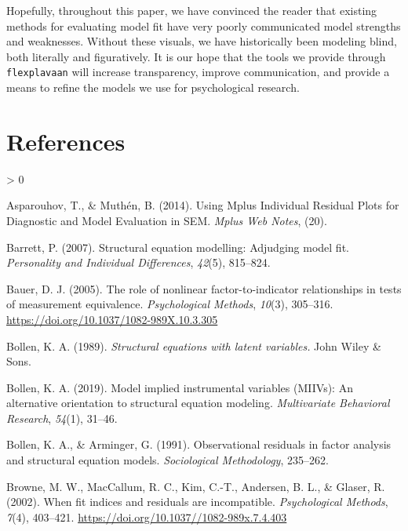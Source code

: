 \documentclass[
  english,
  man]{apa6}
\newlength{\cslhangindent}
\newenvironment{CSLReferences}[2] %
 {%
  \setlength{\parindent}{0pt}
  \ifodd #1 \everypar{\setlength{\hangindent}{\cslhangindent}}\ignorespaces\fi
  \ifnum #2 > 0
  \setlength{\parskip}{#2\baselineskip}
  \fi
 }%
 {}
\begin{document}
Hopefully, throughout this paper, we have convinced the reader that existing methods for evaluating model fit have very poorly communicated model strengths and weaknesses. Without these visuals, we have historically been modeling blind, both literally and figuratively. It is our hope that the tools we provide through \texttt{flexplavaan} will increase transparency, improve communication, and provide a means to refine the models we use for psychological research.

\hypertarget{references}{%
\section{References}\label{references}}

\hypertarget{refs}{}
\begin{CSLReferences}{1}{0}
\leavevmode\hypertarget{ref-asparouhov2014using}{}%
Asparouhov, T., \& Muthén, B. (2014). {Using Mplus Individual Residual Plots for Diagnostic and Model Evaluation in SEM}. \emph{Mplus Web Notes}, (20).

\leavevmode\hypertarget{ref-barrett2007structural}{}%
Barrett, P. (2007). Structural equation modelling: Adjudging model fit. \emph{Personality and Individual Differences}, \emph{42}(5), 815--824.

\leavevmode\hypertarget{ref-Bauer2005}{}%
Bauer, D. J. (2005). {The role of nonlinear factor-to-indicator relationships in tests of measurement equivalence}. \emph{Psychological Methods}, \emph{10}(3), 305--316. \url{https://doi.org/10.1037/1082-989X.10.3.305}

\leavevmode\hypertarget{ref-bollen_structural_1989}{}%
Bollen, K. A. (1989). \emph{{Structural equations with latent variables.}} John Wiley {\&} Sons.

\leavevmode\hypertarget{ref-bollen2019model}{}%
Bollen, K. A. (2019). Model implied instrumental variables ({MIIVs}): An alternative orientation to structural equation modeling. \emph{Multivariate Behavioral Research}, \emph{54}(1), 31--46.

\leavevmode\hypertarget{ref-bollen1991observational}{}%
Bollen, K. A., \& Arminger, G. (1991). Observational residuals in factor analysis and structural equation models. \emph{Sociological Methodology}, 235--262.

\leavevmode\hypertarget{ref-Browne2002}{}%
Browne, M. W., MacCallum, R. C., Kim, C.-T., Andersen, B. L., \& Glaser, R. (2002). {When fit indices and residuals are incompatible}. \emph{Psychological Methods}, \emph{7}(4), 403--421. \url{https://doi.org/10.1037//1082-989x.7.4.403}


\end{CSLReferences}
\end{document}
